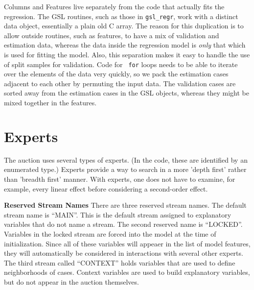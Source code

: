 \documentclass[12pt]{article}
\begin{document}
 Columns and Features live separately from the code that actually fits the
 regression. The GSL routines, such as those in {\tt gsl\_regr}, work with a
 distinct data object, essentially a plain old C array.  The reason for this
 duplication is to allow outside routines, such as features, to have a mix of
 validation and estimation data, whereas the data inside the regression model is
 {\em only} that which is used for fitting the model.  Also, this separation
 makes it easy to handle the use of split samples for validation. Code for {\tt
 for} loops needs to be able to iterate over the elements of the data very
 quickly, so we pack the estimation cases adjacent to each other by permuting
 the input data.  The validation cases are sorted away from the estimation cases
 in the GSL objects, whereas they might be mixed together in the features.



\section{Experts} %

 The auction uses several types of experts.  (In the code, these are identified
 by an enumerated type.)  Experts provide a way to search in a more 'depth
 first' rather than 'breadth first' manner.  With experts, one does not have to
 examine, for example, every linear effect before considering a second-order
 effect.

 {\bf Reserved Stream Names} There are three reserved stream names.  The default
 stream name is ``MAIN''.  This is the default stream assigned to explanatory
 variables that do not name a stream.  The second reserved name is ``LOCKED''.
  Variables in the locked stream are forced into the model at the time of
 initialization.  Since all of these variables will appeaer in the list of model
 features, they will automatically be considered in interactions with several
 other experts.  The third stream called ``CONTEXT'' holds variables that are
 used to define neighborhoods of cases.  Context variables are used to build
 explanatory variables, but do not appear in the auction themselves.
\end{document}
